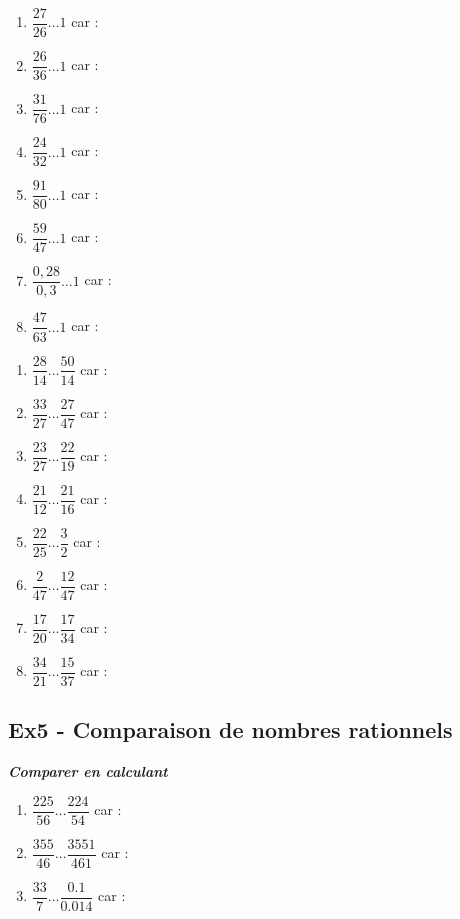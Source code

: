 \documentclass[11pt]{article}
\begin{document}
\begin{multicols}{2}

  \begin{enumerate}
    \item $ \dfrac{27}{26} \ldots 1 $ car : \dotfill
    \item $ \dfrac{26}{36}  \ldots 1 $ car : \dotfill
    \item $ \dfrac{31}{76} \ldots 1 $ car : \dotfill
    \item $ \dfrac{24}{32} \ldots 1 $ car : \dotfill
    \item $ \dfrac{91}{80} \ldots 1 $ car : \dotfill
    \item $ \dfrac{59}{47} \ldots 1 $ car : \dotfill
    \item $ \dfrac{0,28}{0,3} \ldots 1 $ car : \dotfill
    \item $ \dfrac{47}{63} \ldots 1 $ car : \dotfill
  \end{enumerate}

\columnbreak

  \begin{enumerate}
    \item $ \dfrac{28}{14} \ldots \dfrac{50}{14} $  car : \dotfill
    \item $ \dfrac{33}{27} \ldots  \dfrac{27}{47}  $  car : \dotfill
    \item $ \dfrac{23}{27} \ldots \dfrac{22}{19} $  car : \dotfill
    \item $ \dfrac{21}{12} \ldots  \dfrac{21}{16}  $  car : \dotfill
    \item $ \dfrac{22}{25} \ldots \dfrac{3}{2} $  car : \dotfill
    \item $ \dfrac{2}{47} \ldots  \dfrac{12}{47} $  car : \dotfill
    \item $ \dfrac{17}{20} \ldots \dfrac{17}{34} $  car : \dotfill
    \item $ \dfrac{34}{21} \ldots \dfrac{15}{37} $  car : \dotfill
  \end{enumerate}

\end{multicols}

\subsection*{Ex5 - Comparaison de nombres rationnels}

\textit{\textbf{Comparer en calculant}}

\begin{enumerate}
\item $ \dfrac{225}{56} \ldots \dfrac{224}{54} $  car : \dotfill
\item $ \dfrac{355}{46} \ldots \dfrac{3551}{461} $  car : \dotfill
\item $ \dfrac{33}{7} \ldots \dfrac{0.1}{0.014} $  car : \dotfill
\end{enumerate}
\end{document}
